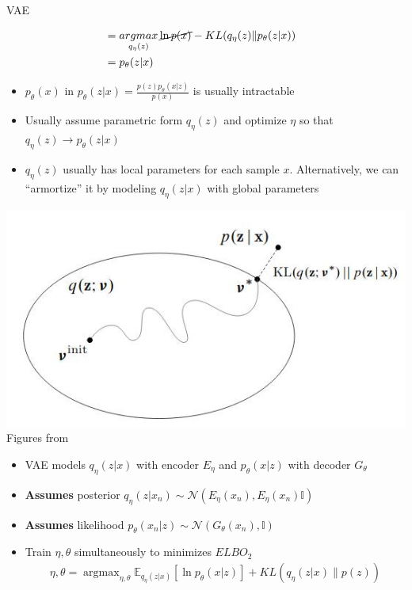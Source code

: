 \documentclass[compress]{beamer}
\newcommand{\expects}[2]{\mathbb{E}_{#1} \left[ #2 \right]}
\begin{document}
\begin{frame}[allowframebreaks]{VAE}
\begin{itemize}
\begin{itemize}
\begin{align*}
                                    &  =  \mathop{argmax}_{q_\eta(z)} \cancel{\ln p(x)} - KL(q_{\eta}(z)\|p_{\theta}(z|x)) & \\ 
                                    & = p_{\theta}(z|x) & \\
                    \end{align*}
            \end{itemize}
    \end{itemize}
    \framebreak
    \begin{itemize}
        \item $p_{\theta}(x)$ in $p_{\theta}(z|x)= \frac{p(z)p_{\theta}(x|z)}{p(x)} $ is usually intractable
        \item Usually assume parametric form $q_{\eta}(z)$ and optimize $\eta$ so that $q_{\eta}(z)\rightarrow p_\theta(z|x)$
        \item $q_\eta(z)$ usually has local parameters for each sample $x$. Alternatively, we can ``armortize'' it by modeling $q_\eta(z|x)$ with global parameters
    \end{itemize}
    \includegraphics[scale=0.5]{vae}
    {
        \tiny{Figures from \cite{blei2016variational}}
    }
    \framebreak

    \begin{itemize}
        \item VAE models $q_{\eta}(z|x)$ with encoder $E_{\eta}$ and $p_{\theta}(x|z)$  with decoder $G_{\theta}$ 
        \item \textbf{Assumes} posterior $q_{\eta}(z|x_n) \sim \mathcal{N}(E_{\eta}(x_n), E_{\eta}(x_n) \mathbb{I})$
        \item \textbf{Assumes} likelihood $p_{\theta}(x_n|z) \sim \mathcal{N}(G_{\theta}(x_n), \mathbb{I})$
        \item Train $\eta, \theta$ simultaneously to minimizes $ELBO_2$
            \begin{align*}
                \eta, \theta = \mathop{argmax}_{\eta, \theta} \expects{q_{\eta}(z|x)}{\ln p_{\theta}(x|z)} + KL(q_{\eta}(z|x)\|p(z))
            \end{align*}
                

\end{itemize}
\end{frame}
\end{document}
